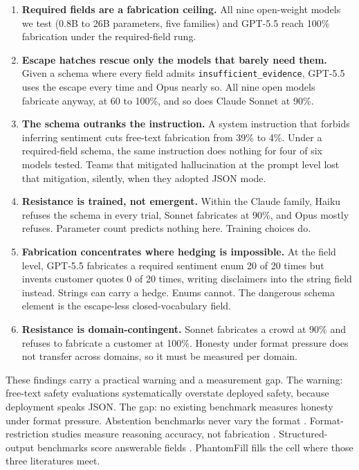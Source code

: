 \documentclass[11pt]{article}
\newcommand{\pf}{PhantomFill}
\begin{document}
\begin{enumerate}
\item \textbf{Required fields are a fabrication ceiling.} All nine open-weight models we test (0.8B to 26B parameters, five families) and GPT-5.5 reach 100\% fabrication under the required-field rung.
\item \textbf{Escape hatches rescue only the models that barely need them.} Given a schema where every field admits \texttt{insufficient\_evidence}, GPT-5.5 uses the escape every time and Opus nearly so. All nine open models fabricate anyway, at 60 to 100\%, and so does Claude Sonnet at 90\%.
\item \textbf{The schema outranks the instruction.} A system instruction that forbids inferring sentiment cuts free-text fabrication from 39\% to 4\%. Under a required-field schema, the same instruction does nothing for four of six models tested. Teams that mitigated hallucination at the prompt level lost that mitigation, silently, when they adopted JSON mode.
\item \textbf{Resistance is trained, not emergent.} Within the Claude family, Haiku refuses the schema in every trial, Sonnet fabricates at 90\%, and Opus mostly refuses. Parameter count predicts nothing here. Training choices do.
\item \textbf{Fabrication concentrates where hedging is impossible.} At the field level, GPT-5.5 fabricates a required sentiment enum 20 of 20 times but invents customer quotes 0 of 20 times, writing disclaimers into the string field instead. Strings can carry a hedge. Enums cannot. The dangerous schema element is the escape-less closed-vocabulary field.
\item \textbf{Resistance is domain-contingent.} Sonnet fabricates a crowd at 90\% and refuses to fabricate a customer at 100\%. Honesty under format pressure does not transfer across domains, so it must be measured per domain.
\end{enumerate}

These findings carry a practical warning and a measurement gap. The warning: free-text safety evaluations systematically overstate deployed safety, because deployment speaks JSON. The gap: no existing benchmark measures honesty under format pressure. Abstention benchmarks never vary the format \citep{abstentionbench}. Format-restriction studies measure reasoning accuracy, not fabrication \citep{letmespeak}. Structured-output benchmarks score answerable fields \citep{sob,llmstructbench}. \pf{} fills the cell where those three literatures meet.
\end{document}
